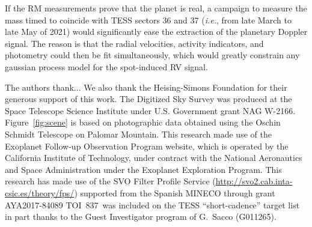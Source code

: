 \documentclass[12pt,twocolumn,tighten]{aastex63}
\newcommand{\tn}{TOI~837} %
\begin{document}
If the RM measurements prove that the planet
is real, a campaign to measure the mass timed to coincide with
TESS sectors 36 and 37 ({\it i.e.}, from late March to late May of
2021) would significantly ease the extraction of the planetary Doppler
signal.  The reason is that the radial velocities, activity
indicators, and photometry could then be fit simultaneously, which
would greatly constrain any gaussian process model for the
spot-induced RV signal. 





\acknowledgements
%
%
%
The authors thank...
%
We also thank the Heising-Simons Foundation for
their generous support of this work.
%
The Digitized Sky Survey was produced at the Space Telescope Science
Institute under U.S. Government grant NAG W-2166.
Figure~\ref{fig:scene} is based on photographic data obtained using
the Oschin Schmidt Telescope on Palomar Mountain.
%
This research made use of the Exoplanet Follow-up Observation
Program website, which is operated by the California Institute of
Technology, under contract with the National Aeronautics and Space
Administration under the Exoplanet Exploration Program.
%
This research has made use of the SVO Filter Profile Service
(\url{http://svo2.cab.inta-csic.es/theory/fps/}) supported from the Spanish
MINECO through grant AYA2017-84089
%
\tn\ was included on the TESS ``short-cadence'' target list in part
thanks to the Guest Investigator program of G.\ Sacco (G011265).
\end{document}
